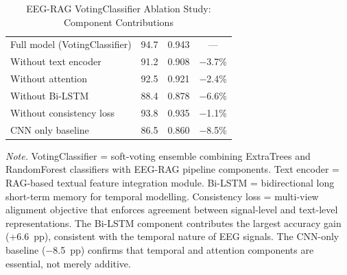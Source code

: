 {\tablestripes\tablefontsize
{}
\begin{xltabular}{\textwidth}{@{} L C C C @{}}
\caption[EEG-RAG VotingClassifier Ablation Study]{EEG-RAG VotingClassifier Ablation Study: Component Contributions}\label{tab:eegrag_ablation} \\
\toprule
{} &  &  &  \\
\midrule
\endfirsthead
\endhead
\bottomrule
\endlastfoot
Full model (VotingClassifier) & 94.7 & 0.943 & --- \\
\addlinespace
Without text encoder & 91.2 & 0.908 & $-$3.7\% \\
\addlinespace
Without attention & 92.5 & 0.921 & $-$2.4\% \\
\addlinespace
Without Bi-LSTM & 88.4 & 0.878 & $-$6.6\% \\
\addlinespace
Without consistency loss & 93.8 & 0.935 & $-$1.1\% \\
\addlinespace
CNN only baseline & 86.5 & 0.860 & $-$8.5\% \\
\end{xltabular}}
\vspace{0.5em}\noindent\textit{Note.} VotingClassifier = soft-voting ensemble combining ExtraTrees and RandomForest classifiers with EEG-RAG pipeline components. Text encoder = RAG-based textual feature integration module. Bi-LSTM = bidirectional long short-term memory for temporal modelling. Consistency loss = multi-view alignment objective that enforces agreement between signal-level and text-level representations. The Bi-LSTM component contributes the largest accuracy gain (+6.6~pp), consistent with the temporal nature of EEG signals. The CNN-only baseline ($-$8.5~pp) confirms that temporal and attention components are essential, not merely additive.


